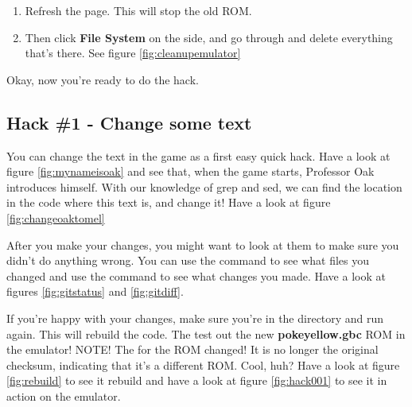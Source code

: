 \documentclass[12pt,a4]{article}
\begin{document}
\begin{enumerate}
    \item Refresh the page. This will stop the old ROM.
    \item Then click \textbf{File System} on the side, and go through and delete everything that's there. See figure \ref{fig:cleanupemulator}
\end{enumerate}


Okay, now you're ready to do the hack.

\subsection{Hack \#1 - Change some text}

You can change the text in the game as a first easy quick hack. Have a look at figure \ref{fig:mynameisoak} and see that, when the game starts, Professor Oak introduces himself. With our knowledge of grep and sed, we can find the location in the code where this text is, and change it! Have a look at figure \ref{fig:changeoaktomel}


After you make your changes, you might want to look at them to make sure you didn't do anything wrong. You can use the  command to see what files you changed and use the  command to see what changes you made. Have a look at figures \ref{fig:gitstatus} and \ref{fig:gitdiff}.


If you're happy with your changes, make sure you're in the  directory and run  again. This will rebuild the code. The test out the new \textbf{pokeyellow.gbc} ROM in the emulator!  NOTE! The  for the ROM changed! It is no longer the original checksum, indicating that it's a different ROM. Cool, huh? Have a look at figure \ref{fig:rebuild} to see it rebuild and have a look at figure \ref{fig:hack001} to see it in action on the emulator.

\end{document}
